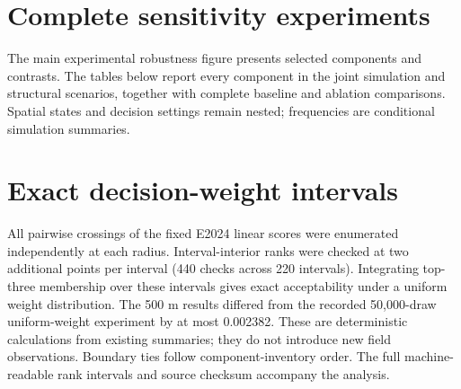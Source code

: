 \documentclass[10pt,a4paper]{article}
\begin{document}
\section{Complete sensitivity experiments}
The main experimental robustness figure presents selected components and contrasts. The tables below report every component in the joint simulation and structural scenarios, together with complete baseline and ablation comparisons. Spatial states and decision settings remain nested; frequencies are conditional simulation summaries.



\section{Exact decision-weight intervals}
All pairwise crossings of the fixed E2024 linear scores were enumerated independently at each radius. Interval-interior ranks were checked at two additional points per interval (440 checks across 220 intervals). Integrating top-three membership over these intervals gives exact acceptability under a uniform weight distribution. The 500 m results differed from the recorded 50,000-draw uniform-weight experiment by at most 0.002382. These are deterministic calculations from existing summaries; they do not introduce new field observations. Boundary ties follow component-inventory order. The full machine-readable rank intervals and source checksum accompany the analysis.

\end{document}
